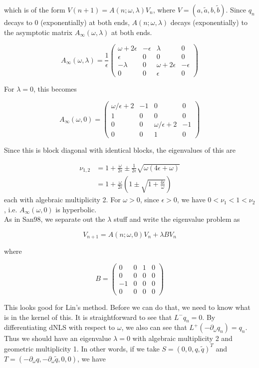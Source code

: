 \documentclass[12pt]{article}
\begin{document}
which is of the form $V(n+1) = A(n; \omega, \lambda) V_n$, where $V = (a, \tilde{a}, b, \tilde{b})$. Since $q_n$ decays to 0 (exponentially) at both ends, $A(n; \omega, \lambda)$ decays (exponentially) to the asymptotic matrix $A_\infty(\omega, \lambda)$ at both ends.

\[
A_\infty(\omega, \lambda) = 
\frac{1}{\epsilon}
\begin{pmatrix}
\omega + 2 \epsilon & -\epsilon & \lambda & 0 \\
\epsilon & 0 & 0 & 0 \\
-\lambda & 0 & \omega + 2 \epsilon & -\epsilon \\
0 & 0 & \epsilon & 0
\end{pmatrix}
\]

For $\lambda = 0$, this becomes

\[
A_\infty(\omega, 0) = 
\begin{pmatrix}
\omega/\epsilon + 2 & -1 & 0 & 0 \\
1 & 0 & 0 & 0 \\
0 & 0 & \omega/\epsilon + 2 & -1\\
0 & 0 & 1 & 0
\end{pmatrix}
\]

Since this is block diagonal with identical blocks, the eigenvalues of this are 

\begin{align*}
\nu_{1,2} &= 1 + \frac{\omega}{2 \epsilon} \pm \frac{1}{2 \epsilon} \sqrt{\omega(4 \epsilon + \omega)} \\
&= 1 + \frac{\omega}{2 \epsilon} \left( 1 \pm \sqrt{1 + \frac{4 \epsilon}{\omega}} \right)
\end{align*}
each with algebraic multiplicity 2. For $\omega > 0$, since $\epsilon > 0$, we have $0 < \nu_1 < 1 < \nu_2$, i.e. $A_\infty(\omega, 0)$ is hyperbolic.\\

As in San98, we separate out the $\lambda$ stuff and write the eigenvalue problem as

\[
V_{n+1} = A(n; \omega, 0) V_n + \lambda B V_n
\]

where

\[
B = 
\begin{pmatrix}
0 & 0 & 1 & 0 \\
0 & 0 & 0 & 0 \\
-1 & 0 & 0 & 0 \\
0 & 0 & 0 & 0
\end{pmatrix}
\]

This looks good for Lin's method. Before we can do that, we need to know what is in the kernel of this. It is straightforward to see that $L^- q_n = 0$. By differentiating dNLS with respect to $\omega$, we also can see that $L^+ (-\partial_\omega q_n) = q_n$. Thus we should have an eigenvalue $\lambda = 0$ with algebraic multiplicity 2 and geometric multiplicity 1. In other words, if we take $S = (0, 0, q, \tilde{q})^T$ and $T = (-\partial_\omega q, -\partial_\omega \tilde{q}, 0, 0)$, we have
\end{document}
